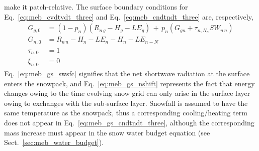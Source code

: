 {make it patch-relative.
%
The surface boundary conditions for
Eq.~\ref{eq:meb_cvdtvdt_three} and Eq.~\ref{eq:meb_cndtndt_three} 
are, respectively,
%
\begin{align}
\label{eq:meb_gs_cvdtvdt_three}
%
G_{g,0} &= \left(1-p_{n}\right)\left( R_{n\,g} - H_{g} -
  LE_{g}\right) 
\,+\, p_n\left(G_{gn} + \tau_{n,N_n}SW_{n\,n}\right)
%
\\
\label{eq:meb_gs_cndtndt_three}
G_{n,0} &= R_{n\,n} - H_{n} - LE_{n}- H_{n} - LE_{n-N} 
%
\\
\label{eq:meb_gs_swsfc}
\tau_{n,0} &= 1
\\
\label{eq:meb_gs_nshift}
\xi_{n,0} &= 0
%
\end{align}
%
Eq.~\ref{eq:meb_gs_swsfc} signifies that the net shortwave radiation at the surface
enters the snowpack, and Eq.~\ref{eq:meb_gs_nshift} represents the fact
that energy changes owing to the time evolving snow grid can only
arise in the surface layer owing to exchanges with the sub-surface layer.
%
Snowfall is assumed to have the same temperature as the
snowpack, thus a corresponding cooling/heating term
does not appear in Eq.~\ref{eq:meb_gs_cndtndt_three}, although the
corresponding mass increase must appear in the snow water budget 
equation (see Sect.~\ref{sec:meb_water_budget}).

}
